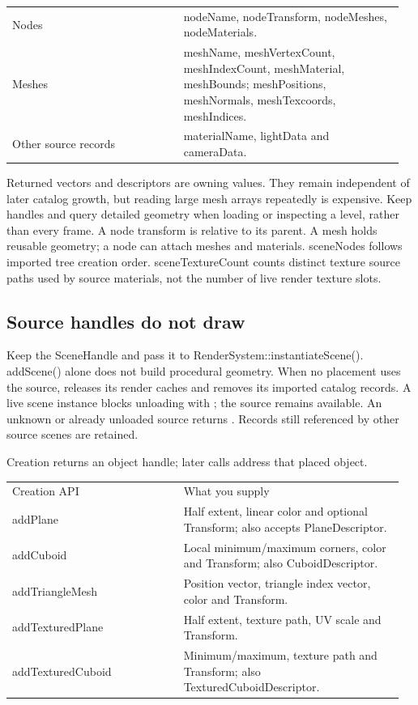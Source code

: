 \documentclass[11pt,a4paper]{article}
\begin{document}
{\small
\begin{longtable}{@{}p{0.42\linewidth}p{0.54\linewidth}@{}}
Nodes & nodeName, nodeTransform, nodeMeshes, nodeMaterials. \\
Meshes & meshName, meshVertexCount, meshIndexCount, meshMaterial, meshBounds; meshPositions, meshNormals, meshTexcoords, meshIndices. \\
Other source records & materialName, lightData and cameraData. \\
\end{longtable}
}

Returned vectors and descriptors are owning values. They remain independent of later catalog growth, but reading large mesh arrays repeatedly is expensive. Keep handles and query detailed geometry when loading or inspecting a level, rather than every frame. A node transform is relative to its parent. A mesh holds reusable geometry; a node can attach meshes and materials. sceneNodes follows imported tree creation order. sceneTextureCount counts distinct texture source paths used by source materials, not the number of live render texture slots.

\subsection*{Source handles do not draw}
Keep the SceneHandle and pass it to RenderSystem::instantiateScene(). addScene() alone does not build procedural geometry. When no placement uses the source,  releases its render caches and removes its imported catalog records. A live scene instance blocks unloading with ; the source remains available. An unknown or already unloaded source returns . Records still referenced by other source scenes are retained.

\label{core-15}
Creation returns an object handle; later calls address that placed object.

{\small
\begin{longtable}{@{}p{0.42\linewidth}p{0.54\linewidth}@{}}
Creation API & What you supply \\
addPlane & Half extent, linear color and optional Transform; also accepts PlaneDescriptor. \\
addCuboid & Local minimum/maximum corners, color and Transform; also CuboidDescriptor. \\
addTriangleMesh & Position vector, triangle index vector, color and Transform. \\
addTexturedPlane & Half extent, texture path, UV scale and Transform. \\
addTexturedCuboid & Minimum/maximum, texture path and Transform; also TexturedCuboidDescriptor. \\
\end{longtable}
}
\end{document}

